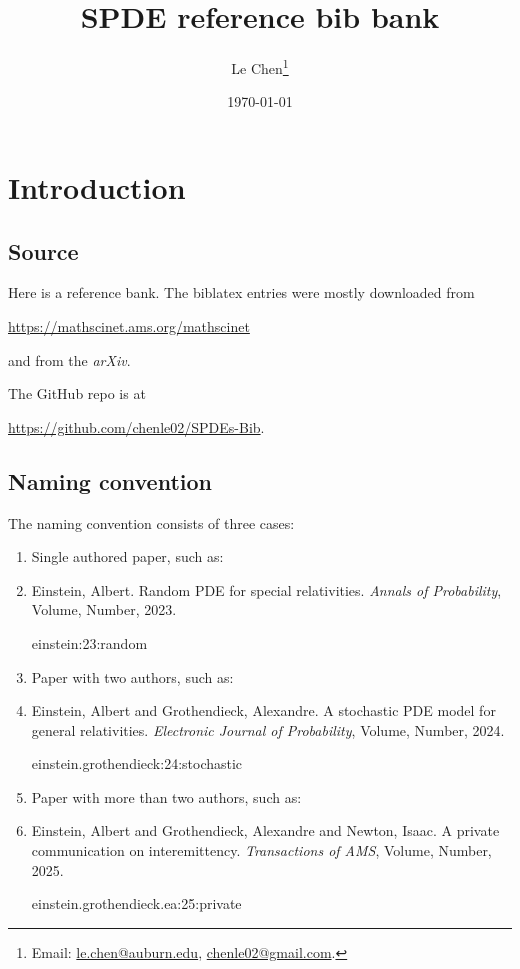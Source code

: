 \documentclass[a4paper,11pt]{article}
\title{SPDE reference bib bank}
\author{Le Chen\footnote{Email: \url{le.chen@auburn.edu}, \url{chenle02@gmail.com}.}}
\date{\today}
\begin{document}
\maketitle
\tableofcontents

\section{Introduction}

\subsection{Source}
Here is a reference bank. The biblatex entries were mostly downloaded from

\begin{center}
  \url{https://mathscinet.ams.org/mathscinet}
\end{center}

\noindent and from the \textit{arXiv}. \bigskip

The GitHub repo is at
\begin{center}
  \url{https://github.com/chenle02/SPDEs-Bib}.
\end{center}

\subsection{Naming convention}

The naming convention consists of three cases:
\begin{enumerate}
  \item Single authored paper, such as:
  \item[] Einstein, Albert. Random PDE for special relativities.
    \textit{Annals of Probability}, Volume, Number, 2023.
    \begin{center}
      einstein:23:random
    \end{center}
    \bigskip

  \item Paper with two authors, such as:
  \item[] Einstein, Albert and Grothendieck, Alexandre. A stochastic PDE
    model for general relativities. \textit{Electronic Journal of Probability},
    Volume, Number, 2024.
    \begin{center}
      einstein.grothendieck:24:stochastic
    \end{center}
    
  \item Paper with more than two authors, such as:
  \item[] Einstein, Albert and Grothendieck, Alexandre and Newton, Isaac.
    A private communication on interemittency. \textit{Transactions of AMS},
    Volume, Number, 2025.
    \begin{center}
      einstein.grothendieck.ea:25:private
    \end{center}
\end{enumerate}
\end{document}
